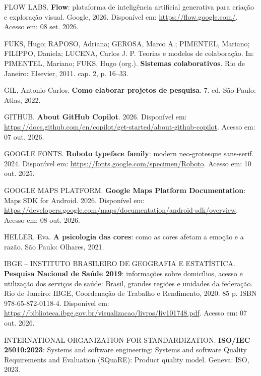 \begin{flushleft}
\vspace{12pt}
\noindent FLOW LABS. \textbf{Flow}: plataforma de inteligência artificial generativa para criação e exploração visual. Google, 2026. Disponível em: \url{https://flow.google.com/}. Acesso em: 08 set. 2026.

\vspace{12pt}
\noindent FUKS, Hugo; RAPOSO, Adriana; GEROSA, Marco A.; PIMENTEL, Mariano; FILIPPO, Daniela; LUCENA, Carlos J. P. Teorias e modelos de colaboração. In: PIMENTEL, Mariano; FUKS, Hugo (org.). \textbf{Sistemas colaborativos}. Rio de Janeiro: Elsevier, 2011. cap. 2, p. 16--33.

\vspace{12pt}
\noindent GIL, Antonio Carlos. \textbf{Como elaborar projetos de pesquisa}. 7. ed. São Paulo: Atlas, 2022.

\vspace{12pt}
\noindent GITHUB. \textbf{About GitHub Copilot}. 2026. Disponível em: \url{https://docs.github.com/en/copilot/get-started/about-github-copilot}. Acesso em: 07 out. 2026.

\vspace{12pt}
\noindent GOOGLE FONTS. \textbf{Roboto typeface family}: modern neo-grotesque sans-serif. 2024. Disponível em: \url{https://fonts.google.com/specimen/Roboto}. Acesso em: 10 out. 2025.

\vspace{12pt}
\noindent GOOGLE MAPS PLATFORM. \textbf{Google Maps Platform Documentation}: Maps SDK for Android. 2026. Disponível em: \url{https://developers.google.com/maps/documentation/android-sdk/overview}. Acesso em: 08 out. 2026.

\vspace{12pt}
\noindent HELLER, Eva. \textbf{A psicologia das cores}: como as cores afetam a emoção e a razão. São Paulo: Olhares, 2021.

\vspace{12pt}
\noindent IBGE -- INSTITUTO BRASILEIRO DE GEOGRAFIA E ESTATÍSTICA. \textbf{Pesquisa Nacional de Saúde 2019}: informações sobre domicílios, acesso e utilização dos serviços de saúde: Brasil, grandes regiões e unidades da federação. Rio de Janeiro: IBGE, Coordenação de Trabalho e Rendimento, 2020. 85 p. ISBN 978-65-872-0118-4. Disponível em: \url{https://biblioteca.ibge.gov.br/visualizacao/livros/liv101748.pdf}. Acesso em: 07 out. 2026.

\vspace{12pt}
\vspace{12pt}
\noindent INTERNATIONAL ORGANIZATION FOR STANDARDIZATION. \textbf{ISO/IEC 25010:2023}: Systems and software engineering: Systems and software Quality Requirements and Evaluation (SQuaRE): Product quality model. Geneva: ISO, 2023.


\end{flushleft}
